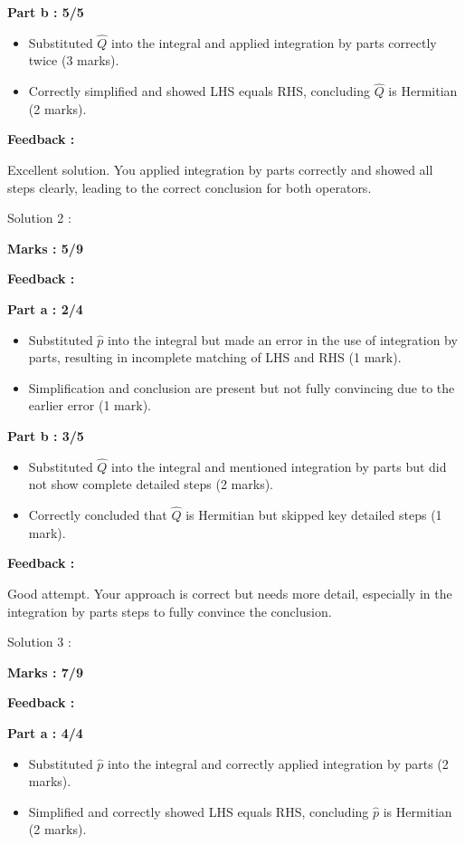 \documentclass[a4paper,11pt]{article}
\begin{document}
\textbf{Part b : 5/5}

\begin{itemize}
    \item Substituted $\hat{Q}$ into the integral and applied integration by parts correctly twice (3 marks).
    \item Correctly simplified and showed LHS equals RHS, concluding $\hat{Q}$ is Hermitian (2 marks).
\end{itemize}

\textbf{Feedback :}

Excellent solution. You applied integration by parts correctly and showed all steps clearly, leading to the correct conclusion for both operators.



Solution 2 :

\textbf{Marks : 5/9}

\textbf{Feedback :}

\textbf{Part a : 2/4}

\begin{itemize}
    \item Substituted $\hat{p}$ into the integral but made an error in the use of integration by parts, resulting in incomplete matching of LHS and RHS (1 mark).
    \item Simplification and conclusion are present but not fully convincing due to the earlier error (1 mark).
\end{itemize}


\textbf{Part b : 3/5}

\begin{itemize}
    \item Substituted $\hat{Q}$ into the integral and mentioned integration by parts but did not show complete detailed steps (2 marks).
    \item Correctly concluded that $\hat{Q}$ is Hermitian but skipped key detailed steps (1 mark).
\end{itemize}

\textbf{Feedback :}

Good attempt. Your approach is correct but needs more detail, especially in the integration by parts steps to fully convince the conclusion.



Solution 3 :

\textbf{Marks : 7/9}

\textbf{Feedback :}

\textbf{Part a : 4/4}

\begin{itemize}
    \item Substituted $\hat{p}$ into the integral and correctly applied integration by parts (2 marks).
    \item Simplified and correctly showed LHS equals RHS, concluding $\hat{p}$ is Hermitian (2 marks).
\end{itemize}
\end{document}
